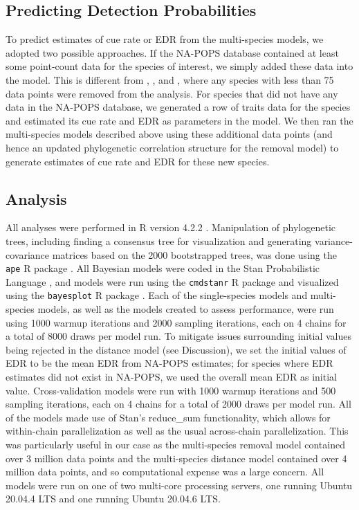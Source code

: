 \documentclass[12pt]{article}
\begin{document}
\subsection{Predicting Detection Probabilities}
\par To predict estimates of cue rate or EDR from the multi-species models, we adopted two possible approaches.
If the NA-POPS database contained at least some point-count data for the species of interest, we simply added these data into the model.
This is different from \citet{edwards_point_2023}, \citet{solymos_calibrating_2013}, and \citet{solymos_evaluating_2018}, where any species with less than 75 data points were removed from the analysis.
For species that did not have any data in the NA-POPS database, we generated a row of traits data for the species and estimated its cue rate and EDR as parameters in the model.
We then ran the multi-species models described above using these additional data points (and hence an updated phylogenetic correlation structure for the removal model) to generate estimates of cue rate and EDR for these new species.

\subsection{Analysis}
\par All analyses were performed in R version 4.2.2 \citep{r_core_team_r_2022}.
Manipulation of phylogenetic trees, including finding a consensus tree for visualization and generating variance-covariance matrices based on the 2000 bootstrapped trees, was done using the \texttt{ape} R package \citep{paradis_ape_2019}.
All Bayesian models were coded in the Stan Probabilistic Language \cite{stan_development_team_stan_2019}, and models were run using the \texttt{cmdstanr} R package \citep{gabry_cmdstanr_2022} and visualized using the \texttt{bayesplot} R package \citep{gabry_visualization_2019}.
Each of the single-species models and multi-species models, as well as the models created to assess performance, were run using 1000 warmup iterations and 2000 sampling iterations, each on 4 chains for a total of 8000 draws per model run.
To mitigate issues surrounding initial values being rejected in the distance model (see Discussion), we set the initial values of EDR to be the mean EDR from NA-POPS estimates; for species where EDR estimates did not exist in NA-POPS, we used the overall mean EDR as initial value.
Cross-validation models were run with 1000 warmup iterations and 500 sampling iterations, each on 4 chains for a total of 2000 draws per model run.
All of the models made use of Stan's reduce\_sum functionality, which allows for within-chain parallelization as well as the usual across-chain parallelization.
This was particularly useful in our case as the multi-species removal model contained over 3 million data points and the multi-species distance model contained over 4 million data points, and so computational expense was a large concern.
All models were run on one of two multi-core processing servers, one running Ubuntu 20.04.4 LTS and one running Ubuntu 20.04.6 LTS.
\end{document}
